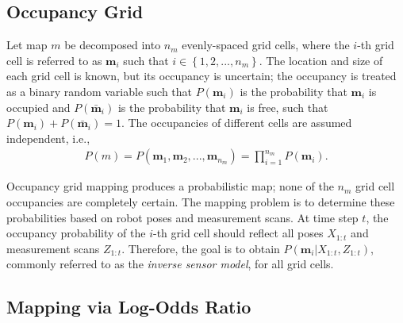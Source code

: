\documentclass[letterpaper, 10pt, conference]{ieeeconf}
\newcommand{\braces}[1]{\ensuremath{\left\{ #1 \right\}}}
\begin{document}
	
\subsection{Occupancy Grid}

Let map $m$ be decomposed into $n_m$ evenly-spaced grid cells, where the $i$-th grid cell is referred to as $\mathbf{m}_i$ such that $i\in\braces{1,2,...,n_m}$.
The location and size of each grid cell is known, but its occupancy is uncertain; the occupancy is treated as a binary random variable such that $P(\mathbf{m}_i)$ is the probability that $\mathbf{m}_i$ is occupied and $P(\bar{\mathbf{m}}_i)$ is the probability that $\mathbf{m}_i$ is free, such that $P(\mathbf{m}_i)+P(\bar{\mathbf{m}}_i)=1$.
The occupancies of different cells are assumed independent, i.e.,
\begin{align}
P(m)=P(\mathbf{m}_1,\mathbf{m}_2,...,\mathbf{m}_{n_m})=\prod_{i=1}^{n_m}P(\mathbf{m}_i).
\end{align}

Occupancy grid mapping produces a probabilistic map; none of the $n_m$ grid cell occupancies are completely certain.
The mapping problem is to determine these probabilities based on robot poses and measurement scans.
At time step $t$, the occupancy probability of the $i$-th grid cell should reflect all poses $X_{1:t}$ and measurement scans $Z_{1:t}$.
Therefore, the goal is to obtain $P(\mathbf{m}_i|X_{1:t},Z_{1:t})$, commonly referred to as the \emph{inverse sensor model}, for all grid cells.

	
\subsection{Mapping via Log-Odds Ratio}
\end{document}

